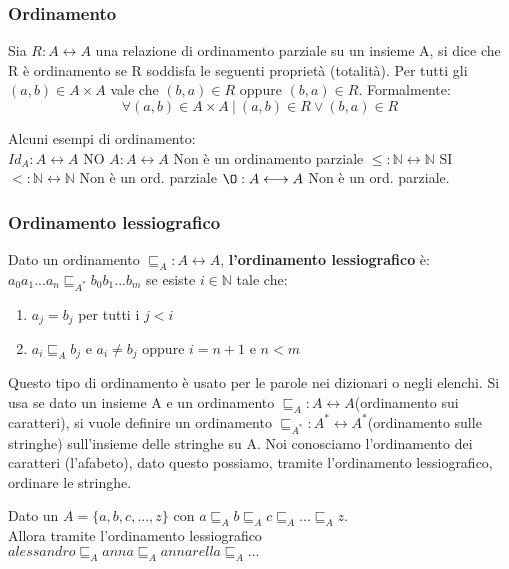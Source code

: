 \subsubsection{Ordinamento}
\begin{definition}[Ordinamento]
    Sia $R: A \longleftrightarrow A$ una relazione di ordinamento parziale su un insieme A, si dice che R è ordinamento se R soddisfa le seguenti proprietà (totalità). Per tutti gli $(a,b) \in A \times A$ vale che $(b,a) \in R$ oppure $(b,a) \in R$. Formalmente:
    \begin{equation}
        \forall (a,b) \in A \times A \: | \: (a,b) \in R \lor (b,a) \in R
    \end{equation}
\end{definition}
\begin{example}
Alcuni esempi di ordinamento:\\
$Id_A: A \longleftrightarrow A$ NO \hspace{.5cm} $A: A \longleftrightarrow A$ Non è un ordinamento parziale  \hspace{.5cm} $\leq: \mathbb{N} \longleftrightarrow \mathbb{N}$ SI \\$<: \mathbb{N} \longleftrightarrow \mathbb{N}$ Non è un ord. parziale \hspace{.7cm} $\O: A \longleftrightarrow A$ Non è un ord. parziale.
\end{example}

\subsubsection{Ordinamento lessiografico}
\begin{definition}
    Dato un ordinamento $\sqsubseteq_A: A \longleftrightarrow A$, \textbf{l'ordinamento lessiografico} è: $a_0a_1... a_n \sqsubseteq_{A^*} b_0b_1...b_m$ se esiste $i \in \mathbb{N}$ tale che:
    \begin{enumerate}
        \item $a_j = b_j$ per tutti i $j < i$
        \item $a_i \sqsubseteq_A b_j$ e $a_i \neq b_j$ oppure $i = n+1$ e $n < m$
    \end{enumerate}
\end{definition}
Questo tipo di ordinamento è usato per le parole nei dizionari o negli elenchi. Si usa se dato un insieme A e un ordinamento $\sqsubseteq_A: A \longleftrightarrow A$(ordinamento sui caratteri), si vuole definire un ordinamento $\sqsubseteq_{A^*}: A^* \longleftrightarrow A^*$(ordinamento sulle stringhe) sull'insieme delle stringhe su A.
Noi conosciamo l'ordinamento dei caratteri (l'afabeto), dato questo possiamo, tramite l'ordinamento lessiografico, ordinare le stringhe.
\begin{example}
Dato un $A = \{a,b,c,...,z\}$ con $a \sqsubseteq_A b \sqsubseteq_A c \sqsubseteq_A ... \sqsubseteq_A z$.\\
Allora tramite l'ordinamento lessiografico $alessandro \sqsubseteq_A anna \sqsubseteq_A annarella \sqsubseteq_A ...$
\end{example}
